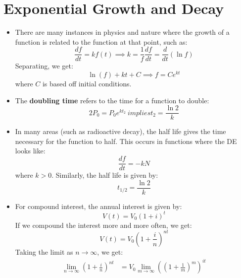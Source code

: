 \section{Exponential Growth and Decay}
\begin{itemize}
    \item There are many instances in physics and nature where the growth of a function is related to the function at that point, such as:
    \begin{equation}
        \frac{df}{dt} = kf(t) \implies k =\frac{1}{f}\frac{df}{dt} = \frac{d}{dt}(\ln f)
        \label{eq:}
    \end{equation}
    Separating, we get:
    \begin{equation}
        \ln(f) + kt + C \implies f = Ce^{kt}
        \label{eq:}
    \end{equation}
    where $C$ is based off initial conditions.
    \item The \textbf{doubling time} refers to the time for a function to double:
    \begin{equation}
        2P_0 = P_0 e^{kt_2} \ implies t_2 = \frac{\ln 2}{k}
        \label{eq:}
    \end{equation}
    \item In many areas (such as radioactive decay), the half life gives the time necessary for the function to half. This occurs in functions where the DE looks like:
    \begin{equation}
        \frac{df}{dt} = -kN
        \label{eq:}
    \end{equation}
    where $k>0$. Similarly, the half life is given by:
    \begin{equation}
        t_{1/2} = \frac{\ln 2}{k}
        \label{eq:}
    \end{equation}
    \item For compound interest, the annual interest is given by:
    \begin{equation}
        V(t) = V_0(1+i)^t
        \label{eq:}
    \end{equation}
    If we compound the interest more and more often, we get:
    \begin{equation}
        V(t) = V_0\left(1+\frac{i}{n}\right)^{nt}
        \label{eq:}
    \end{equation}
    Taking the limit as $n\to \infty$, we get:
    \begin{align}
        \lim_{n\to\infty} \left(1+\frac{i}{n}\right)^{nt} &= V_0\lim_{m\to \infty} \left(\left(1+\frac{1}{m}\right)^m\right)^{it} \\ 

\end{align}
\end{itemize}
